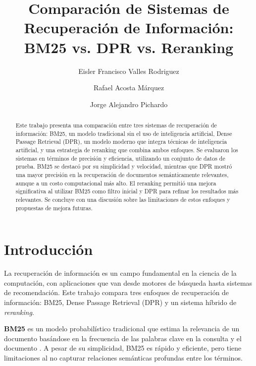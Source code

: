 \documentclass[runningheads]{llncs}
\begin{document}
\title{Comparación de Sistemas de Recuperación de Información: BM25 vs. DPR vs. Reranking}
\author{Eisler Francisco Valles Rodriguez \and Rafael Acosta Márquez \and Jorge Alejandro Pichardo}

\maketitle

\begin{abstract}
Este trabajo presenta una comparación entre tres sistemas de recuperación de información: BM25, un modelo tradicional sin el uso de inteligencia artificial, Dense Passage Retrieval (DPR), un modelo moderno que integra técnicas de inteligencia artificial, y una estrategia de reranking que combina ambos enfoques. Se evaluaron los sistemas en términos de precisión y eficiencia, utilizando un conjunto de datos de prueba. BM25 se destacó por su simplicidad y velocidad, mientras que DPR mostró una mayor precisión en la recuperación de documentos semánticamente relevantes, aunque a un costo computacional más alto. El reranking permitió una mejora significativa al utilizar BM25 como filtro inicial y DPR para refinar los resultados más relevantes. Se concluye con una discusión sobre las limitaciones de estos enfoques y propuestas de mejora futuras.
\end{abstract}

\section{Introducción}
La recuperación de información es un campo fundamental en la ciencia de la computación, con aplicaciones que van desde motores de búsqueda hasta sistemas de recomendación. Este trabajo compara tres enfoques de recuperación de información: BM25, Dense Passage Retrieval (DPR) y un sistema híbrido de \textit{reranking}.

\textbf{BM25} es un modelo probabilístico tradicional que estima la relevancia de un documento basándose en la frecuencia de las palabras clave en la consulta y el documento \cite{bm25}. A pesar de su simplicidad, BM25 es rápido y eficiente, pero tiene limitaciones al no capturar relaciones semánticas profundas entre los términos.
\end{document}
